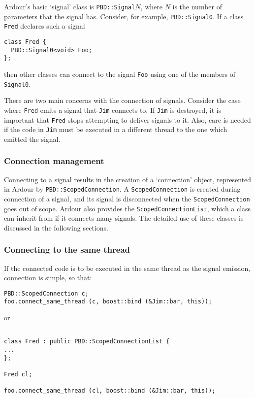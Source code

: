 \documentclass[10pt,a4paper]{book}
\newcommand{\code}[1]{\texttt{#1}}
\begin{document}
Ardour's basic `signal' class is \code{PBD::Signal}$N$, where $N$ is
the number of parameters that the signal has.  Consider, for example,
\code{PBD::Signal0}.  If a class \code{Fred} declares such a signal

\begin{lstlisting}
class Fred {
  PBD::Signal0<void> Foo;
};
\end{lstlisting}

then other classes can connect to the signal \code{Foo} using one of
the members of \code{Signal0}.

There are two main concerns with the connection of signals.  Consider
the case where \code{Fred} emits a signal that \code{Jim} connects to.
If \code{Jim} is destroyed, it is important that \code{Fred} stops
attempting to deliver signals to it.  Also, care is needed if the code
in \code{Jim} must be executed in a different thread to the one which
emitted the signal.

\subsubsection{Connection management}

Connecting to a signal results in the creation of a `connection'
object, represented in Ardour by \code{PBD::ScopedConnection}.  A
\code{ScopedConnection} is created during connection of a signal, and
its signal is disconnected when the \code{ScopedConnection} goes out
of scope.  Ardour also provides the \code{ScopedConnectionList}, which
a class can inherit from if it connects many signals.  The detailed
use of these classes is discussed in the following sections.

\subsubsection{Connecting to the same thread}

If the connected code is to be executed in the same thread as the
signal emission, connection is simple, so that:

\begin{lstlisting}
PBD::ScopedConnection c;
foo.connect_same_thread (c, boost::bind (&Jim::bar, this));
\end{lstlisting}

or

\begin{lstlisting}

class Fred : public PBD::ScopedConnectionList {
...
};

Fred cl;

foo.connect_same_thread (cl, boost::bind (&Jim::bar, this));
\end{lstlisting}
\end{document}
